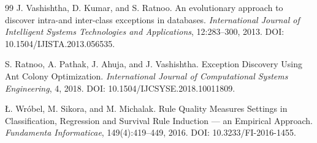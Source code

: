 \begin{thebibliography}{99}
J. Vashishtha, D. Kumar, and S. Ratnoo. An evolutionary
approach to discover intra-and inter-class exceptions in databases.
\emph{International Journal of Intelligent Systems Technologies and Applications},
12:283--300, 2013. DOI: 10.1504/IJISTA.2013.056535.


S. Ratnoo, A. Pathak, J. Ahuja, and J. Vashishtha.
Exception Discovery Using Ant Colony Optimization.
\emph{International Journal of Computational Systems Engineering}, 4, 2018.
DOI: 10.1504/IJCSYSE.2018.10011809.


Ł. Wróbel, M. Sikora, and M. Michalak. Rule Quality Measures
Settings in Classification, Regression and Survival Rule Induction --- an
Empirical Approach. \emph{Fundamenta Informaticae}, 149(4):419--449, 2016.
DOI: 10.3233/FI-2016-1455.

\end{thebibliography}
